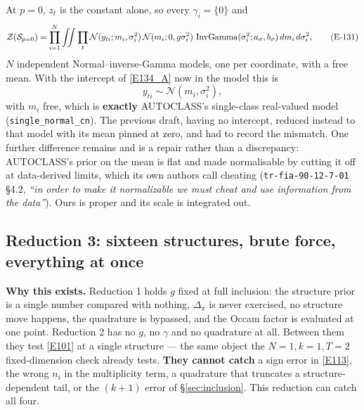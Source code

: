 At $p=0$, $z_t$ is the constant alone, so every $\gamma_i=\{0\}$ and
\begin{equation}
\mathcal{Z}(\mathcal{S}_{p=0}) = \prod_{i=1}^{N}\iint\prod_t\mathcal{N}(y_{ti};m_i,\sigma_i^2)\,
\mathcal{N}(m_i;0,g\sigma_i^2)\,\operatorname{InvGamma}(\sigma_i^2;a_\sigma,b_\sigma)
\,dm_i\,d\sigma_i^2,
\tag{E-131}\label{E131}
\end{equation}
$N$ independent Normal--inverse-Gamma models, one per coordinate, with a free mean.
With the intercept of \eqref{E134_A} now in the model this is
\begin{equation}
y_{ti}\sim\mathcal{N}(m_i,\sigma_i^2),
\tag{E-132}\label{E132}
\end{equation}
with $m_i$ free, which is \textbf{exactly} AUTOCLASS's single-class real-valued model
(\texttt{single\_normal\_cn}). The previous draft, having no intercept, reduced
instead to that model with its mean pinned at zero, and had to record the mismatch.
One further difference remains and is a repair rather than a discrepancy: AUTOCLASS's
prior on the mean is flat and made normalisable by cutting it off at data-derived
limits, which its own authors call cheating (\texttt{tr-fia-90-12-7-01} \S4.2,
\emph{``in order to make it normalizable we must cheat and use information from the
data''}). Ours is proper and its scale is integrated out.

\subsection[Reduction 3: sixteen structures]{Reduction 3: sixteen structures, brute force, everything at
once}\label{sec:red3}

\begin{recordbox}
\textbf{Why this exists.} Reduction 1 holds $g$ fixed at full inclusion: the
structure prior is a single number compared with nothing, $\Delta_\pi$ is never
exercised, no structure move happens, the quadrature is bypassed, and the Occam
factor is evaluated at one point. Reduction 2 has no $g$, no $\gamma$ and no
quadrature at all. Between them they test \eqref{E101} at a single structure --- the
same object the $N=1,k=1,T=2$ fixed-dimension check already tests. \textbf{They
cannot catch} a sign error in \eqref{E113}, the wrong $n_i$ in the multiplicity term,
a quadrature that truncates a structure-dependent tail, or the $(k+1)$ error of
\S\ref{sec:inclusion}. This reduction can catch all four.
\end{recordbox}

